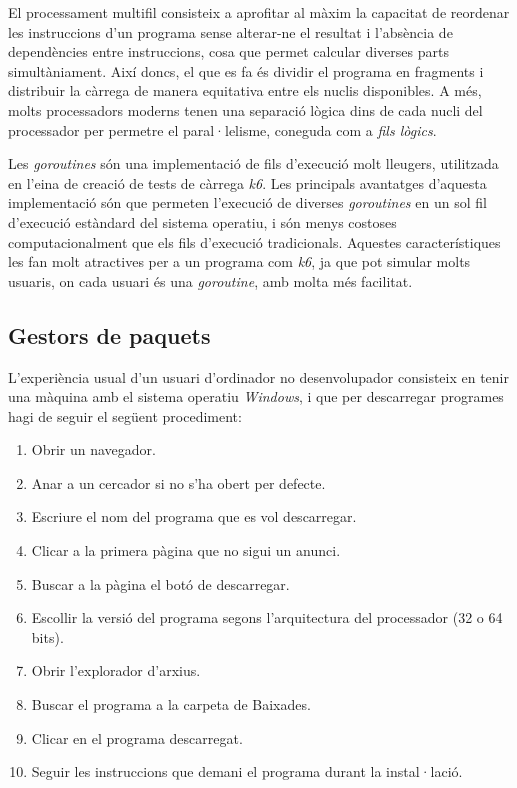 El processament multifil consisteix a aprofitar al màxim la capacitat de reordenar les instruccions d'un programa sense alterar-ne el resultat i l'absència de dependències entre instruccions, cosa que permet calcular diverses parts simultàniament. Així doncs, el que es fa és dividir el programa en fragments i distribuir la càrrega de manera equitativa entre els nuclis disponibles. A més, molts processadors moderns tenen una separació lògica dins de cada nucli del processador per permetre el paral·lelisme, coneguda com a \textit{fils lògics}.\cite{nemirovsky_multithreading_2022}

Les \textit{goroutines} són una implementació de fils d'execució molt lleugers, utilitzada en l'eina de creació de tests de càrrega \textit{k6}. Les principals avantatges d'aquesta implementació són que permeten l'execució de diverses \textit{goroutines} en un sol fil d'execució estàndard del sistema operatiu, i són menys costoses computacionalment que els fils d'execució tradicionals. Aquestes característiques les fan molt atractives per a un programa com \textit{k6}, ja que pot simular molts usuaris, on cada usuari és una \textit{goroutine}, amb molta més facilitat.\cite{alchangian_introduction_2023}

\subsection{Gestors de paquets}
L'experiència usual d'un usuari d'ordinador no desenvolupador consisteix en tenir una màquina amb el sistema operatiu \textit{Windows}, i que per descarregar programes hagi de seguir el següent procediment:

\begin{enumerate} \item Obrir un navegador. \item Anar a un cercador si no s'ha obert per defecte. \item Escriure el nom del programa que es vol descarregar. \item Clicar a la primera pàgina que no sigui un anunci. \item Buscar a la pàgina el botó de descarregar. \item Escollir la versió del programa segons l'arquitectura del processador (32 o 64 bits). \item Obrir l'explorador d'arxius. \item Buscar el programa a la carpeta de Baixades. \item Clicar en el programa descarregat. \item Seguir les instruccions que demani el programa durant la instal·lació. \end{enumerate}

